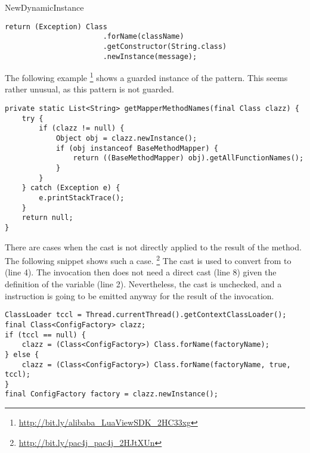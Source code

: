 \begin{pattern}{NewDynamicInstance}
\begin{verbatim}
return (Exception) Class
                       .forName(className)
                       .getConstructor(String.class)
                       .newInstance(message);
\end{verbatim}

The following example%
\footnote{\url{http://bit.ly/alibaba_LuaViewSDK_2HC33xg}}
shows a guarded instance of the \thisp{} pattern.
This seems rather unusual, as this pattern is not guarded.

\begin{verbatim}
private static List<String> getMapperMethodNames(final Class clazz) {
    try {
        if (clazz != null) {
            Object obj = clazz.newInstance();
            if (obj instanceof BaseMethodMapper) {
                return ((BaseMethodMapper) obj).getAllFunctionNames();
            }
        }
    } catch (Exception e) {
        e.printStackTrace();
    }
    return null;
}
\end{verbatim}

There are cases when the cast is not directly applied to the result of the  method.
The following snippet shows such a case.%
\footnote{\url{http://bit.ly/pac4j_pac4j_2HJtXUn}}
The cast is used to convert from  to  (line 4).
The  invocation then does not need a direct cast (line 8) given the definition of the  variable (line 2).
Nevertheless, the cast is unchecked, and a  instruction is going to be emitted anyway for the result of the  invocation.

\begin{verbatim}
ClassLoader tccl = Thread.currentThread().getContextClassLoader();
final Class<ConfigFactory> clazz;
if (tccl == null) {
    clazz = (Class<ConfigFactory>) Class.forName(factoryName);
} else {
    clazz = (Class<ConfigFactory>) Class.forName(factoryName, true, tccl);
}
final ConfigFactory factory = clazz.newInstance();
\end{verbatim}



\end{pattern}
